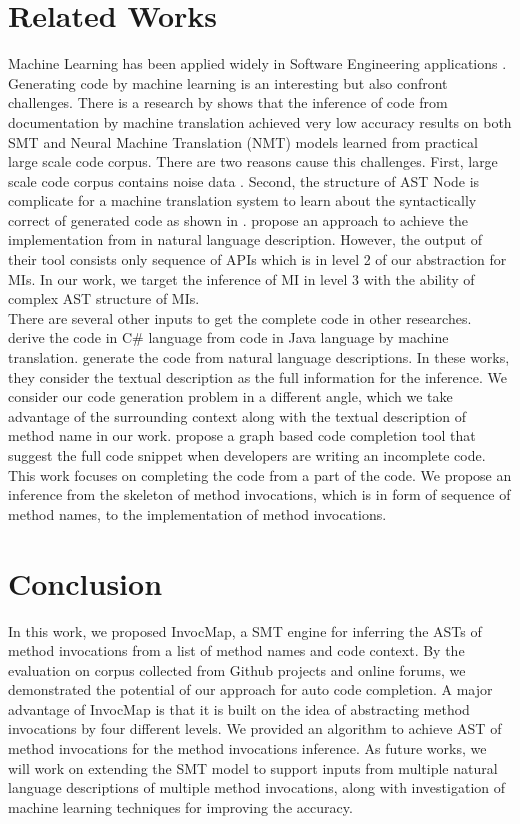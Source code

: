 \section*{Related Works}
Machine Learning has been applied widely in Software Engineering applications \cite{Allamanis:2018:SML:3236632.3212695}. Generating code by machine learning is an interesting but also confront challenges. There is a research by \cite{DBLP:journals/corr/BaroneS17} shows that the inference of code from documentation by machine translation achieved very low accuracy results on both SMT and Neural Machine Translation (NMT) models learned from practical large scale code corpus. There are two reasons cause this challenges. First, large scale code corpus contains noise data \cite{Pascarella:2017:CCC:3104188.3104217}. Second, the structure of AST Node is complicate for a machine translation system to learn about the syntactically correct of generated code as shown in \cite{DBLP:journals/corr/BaroneS17}. \cite{Gu:2016:DAL:2950290.2950334} propose an approach to achieve the implementation from  in natural language description. However, the output of their tool consists only sequence of APIs which is in level 2 of our abstraction for MIs. In our work, we target the inference of MI in level 3 with the ability of complex AST structure of MIs.
\\
There are several other inputs to get the complete code in other researches. \cite{7372046} derive the code in C\# language from code in Java language by machine translation. \cite{Gvero:2015:SJE:2814270.2814295,Gu:2016:DAL:2950290.2950334} generate the code from natural language descriptions. In these works, they consider the textual description as the full information for the inference. We consider our code generation problem in a different angle, which we take advantage of the surrounding context along with the textual description of method name in our work. \cite{6227236} propose a graph based code completion tool that suggest the full code snippet when developers are writing an incomplete code. This work focuses on completing the code from a part of the code. We propose an inference from the skeleton of method invocations, which is in form of sequence of method names, to the implementation of method invocations.
\section*{Conclusion}
In this work, we proposed InvocMap, a SMT engine for inferring
the ASTs of method invocations from a list of method
names and code context. By the evaluation on corpus
collected from Github projects and online forums, we demonstrated
the potential of our approach for auto code completion. A major
advantage of InvocMap is that it is built on the idea of abstracting
method invocations by four different levels. We provided an algorithm
to achieve AST of method invocations for the method invocations inference. As
future works, we will work on extending the SMT model to
support inputs from multiple natural language descriptions of
multiple method invocations, along with investigation of machine learning techniques for improving the accuracy. 





